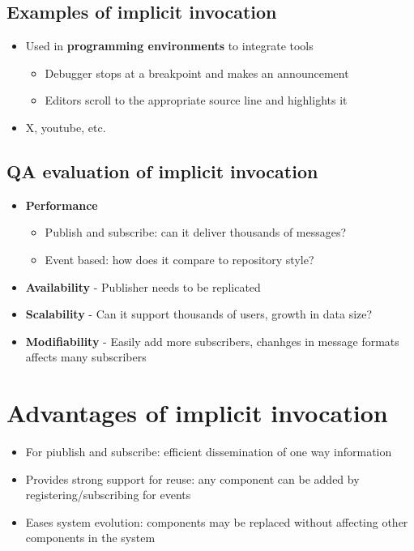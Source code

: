\documentclass[12pt]{book}
\begin{document}
\subsection{Examples of implicit invocation}

\begin{itemize}
    \item Used in \textbf{programming environments} to integrate tools
    \begin{itemize}
        \item Debugger stops at a breakpoint and makes an announcement
        \item Editors scroll to the appropriate source line and highlights it
    \end{itemize} 

    \item X, youtube, etc.
\end{itemize}

\subsection{QA evaluation of implicit invocation}

\begin{itemize}
    \item \textbf{Performance}
    \begin{itemize}
        \item Publish and subscribe: can it deliver thousands of messages?
        \item Event based: how does it compare to repository style?
    \end{itemize} 
    
    \item \textbf{Availability} - Publisher needs to be replicated
    \item \textbf{Scalability} - Can it support thousands of users, growth in data size?
    \item \textbf{Modifiability} - Easily add more subscribers, chanhges in message formats affects many subscribers
\end{itemize}

\section{Advantages of implicit invocation}

\begin{itemize}
    \item For piublish and subscribe: efficient dissemination of one way information
    \item Provides strong support for reuse: any component can be added by registering/subscribing for events
    \item Eases system evolution: components may be replaced without affecting other components in the system
\end{itemize}
\end{document}
